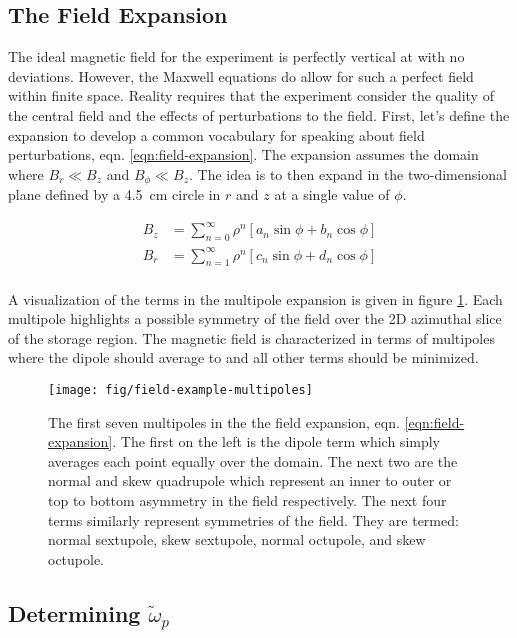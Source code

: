 \subsection{The Field Expansion}

The ideal magnetic field for the experiment is perfectly vertical at \bmagic with no deviations.  However, the Maxwell equations do allow for such a perfect field within finite space.  Reality requires that the experiment consider the quality of the central field and the effects of perturbations to the field.  First, let's define the expansion to develop a common vocabulary for speaking about field perturbations, eqn. \ref{eqn:field-expansion}.  The expansion assumes the domain where $B_r \ll B_z$ and $B_\phi \ll B_z$.  The idea is to then expand in the two-dimensional plane defined by a \SI{4.5}{\cm} circle in $r$ and $z$ at a single value of $\phi$.

\begin{align}
\label{eqn:field-expansion}
B_z & = \sum_{n=0}^{\infty} \rho^n[a_n \sin{\phi} + b_n \cos{\phi}] \\
B_r & = \sum_{n=1}^{\infty} \rho^n[c_n \sin{\phi} + d_n \cos{\phi}] \\
\end{align}

\noindent
A visualization of the terms in the multipole expansion is given in figure \ref{fig:field-example-multipoles}.  Each multipole highlights a possible symmetry of the field over the 2D azimuthal slice of the storage region. The magnetic field is characterized in terms of multipoles where the dipole should average to \bmagic and all other terms should be minimized.

\begin{figure}
\label{fig:field-example-multipoles}
\texttt{[image: fig/field-example-multipoles]}
\caption{The first seven multipoles in the the field expansion, eqn. \ref{eqn:field-expansion}.  The first on the left is the dipole term which simply averages each point equally over the domain.  The next two are the normal and skew quadrupole which represent an inner to outer or top to bottom asymmetry in the field respectively.  The next four terms similarly represent symmetries of the field.  They are termed: normal sextupole, skew sextupole, normal octupole, and skew octupole.}
\end{figure}

\subsection{Determining $\tilde{\omega}_p$}


